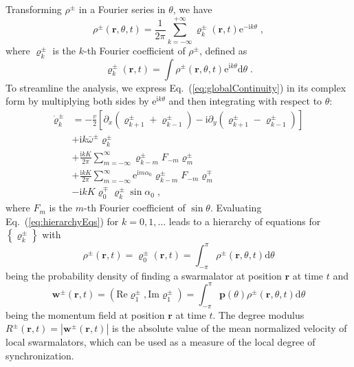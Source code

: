 \documentclass{article}
\begin{document}
Transforming $\rho^{\pm}$ in a Fourier series in $\theta$, we have 
\begin{equation}
    \rho ^{\pm}\left( \mathbf{r},\theta ,t \right) =\frac{1}{2\pi}\sum_{k=-\infty}^{+\infty}{\varrho _{k}^{\pm}\left( \mathbf{r},t \right)}\mathrm{e}^{-\mathrm{i}k\theta}\;,
\end{equation}
where $\varrho _{k}^{\pm}$ is the $k$-th Fourier coefficient of $\rho^{\pm}$, defined as
\begin{equation}
    \varrho _{k}^{\pm}\left( \mathbf{r},t \right) =\int{\rho ^{\pm}\left( \mathbf{r},\theta ,t \right) \text{e}^{\text{i}k\theta}\text{d}\theta}\;.
\end{equation}
To streamline the analysis, we express Eq.~(\ref{eq:globalContinuity}) in its complex form by multiplying both sides by $\mathrm{e}^{\mathrm{i}k\theta}$ and then integrating with respect to $\theta$:
\begin{equation}
    \label{eq:hierarchyEqs}
    \begin{aligned}
        \dot{\varrho}_{k}^{\pm}&=-\frac{v}{2}\left[ \partial _x\left( \varrho _{k+1}^{\pm}+\varrho _{k-1}^{\pm} \right) -\mathrm{i}\partial _y\left( \varrho _{k+1}^{\pm}-\varrho _{k-1}^{\pm} \right) \right]\\
        &+\mathrm{i}k\bar{\omega}^{\pm}\varrho _{k}^{\pm}\\
        &+\frac{\mathrm{i}kK}{2\pi}\sum_{m=-\infty}^{\infty}{\varrho _{k-m}^{\pm}F_{-m}\varrho _{m}^{\pm}}\\
        &+\frac{\mathrm{i}kK}{2\pi}\sum_{m=-\infty}^{\infty}{\mathrm{e}^{\mathrm{i}m\alpha _0}\varrho _{k-m}^{\pm}F_{-m}\varrho _{m}^{\mp}}\\
        &-\mathrm{i}kK\varrho _{0}^{\mp}\varrho _{k}^{\pm}\sin \alpha _0\;,
    \end{aligned}
\end{equation}
where $F_m$ is the $m$-th Fourier coefficient of $\sin \theta$. Evaluating Eq.~(\ref{eq:hierarchyEqs}) for $k=0, 1, \dots$ leads to a hierarchy of equations for $\left\{\varrho_k^{\pm}\right\}$ with 
\begin{equation}
    \rho^{\pm} \left(\mathbf{r}, t\right)=\varrho_0^{\pm}\left(\mathbf{r}, t\right) = \int_{-\pi}^{\pi}{\rho^{\pm}\left(\mathbf{r}, \theta, t\right)\mathrm{d}\theta}
\end{equation}
being the probability density of finding a swarmalator at position $\mathbf{r}$ at time $t$ and 
\begin{equation}
    \mathbf{w}^{\pm}\left( \mathbf{r},t \right) =\left( \mathrm{Re}\varrho _1^{\pm},\mathrm{Im}\varrho _1^{\pm} \right) =\int_{-\pi}^{\pi}{\mathbf{p}\left( \theta \right) \rho^{\pm} \left( \mathbf{r},\theta ,t \right) \mathrm{d}\theta}
\end{equation}
being the momentum field at position $\mathbf{r}$ at time $t$.
The degree modulus $R^{\pm}\left( \mathbf{r},t \right) =\left| \mathbf{w}^{\pm}\left( \mathbf{r},t \right) \right|$ is the absolute value of the mean normalized velocity of local swarmalators, which can be used as a measure of the local degree of synchronization. 
\end{document}
